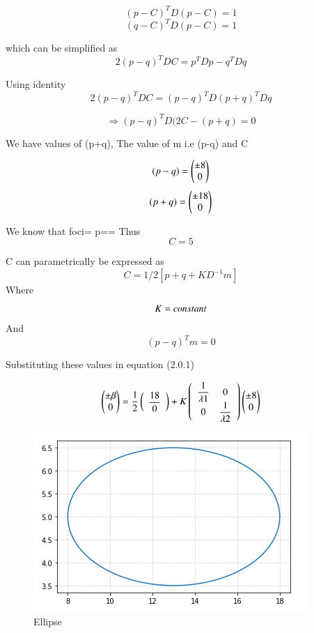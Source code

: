 \documentclass[journal,12pt,twocolumn]{IEEEtran}
\begin{document}
$$(p-C)^T D (p-C)=1$$
$$(q-C)^T D (p-C)=1$$

which can be simplified as 
$$2(p-q)^T DC= p^T Dp-q^T Dq$$

Using identity
$$2(p-q)^T DC= (p-q)^TD(p+q)^TDq$$

$$\Rightarrow (p-q)^T D (2C-(p+q) = 0$$

We have values of (p+q), The value of m i.e (p-q) and C

$$(p-q)= \begin{pmatrix}\pm 8\\0\end{pmatrix}$$
$$(p+q)=\begin{pmatrix}\pm 18\\0\end{pmatrix}$$

We know that foci= p==
Thus $$C=5$$


C can parametrically be expressed as
\begin{equation}
C=1/2 [p+q+KD^{-1}m]
\end{equation}
Where
$$\newline K= constant$$
And $$(p-q)^Tm=0$$

Substituting these values in equation (2.0.1)

$$\begin{pmatrix}\pm \beta\\0\end{pmatrix}=\dfrac{1}{2}\left(\begin{array}{cc}\dfrac{18}{0}\end{array}\right)+K \left(\begin{array}{cc} \dfrac{1}{\lambda1} & 0\\ 0 & \dfrac{1}{\lambda2}\end{array}\right)\begin{pmatrix}\pm 8\\0\end{pmatrix}$$


\begin{figure}[ht]
    \centering
    \includegraphics[width=\columnwidth]{ellipse.png}
    \caption{Ellipse}
    \label{Ellipse along given axis}
\end{figure}
\end{document}

